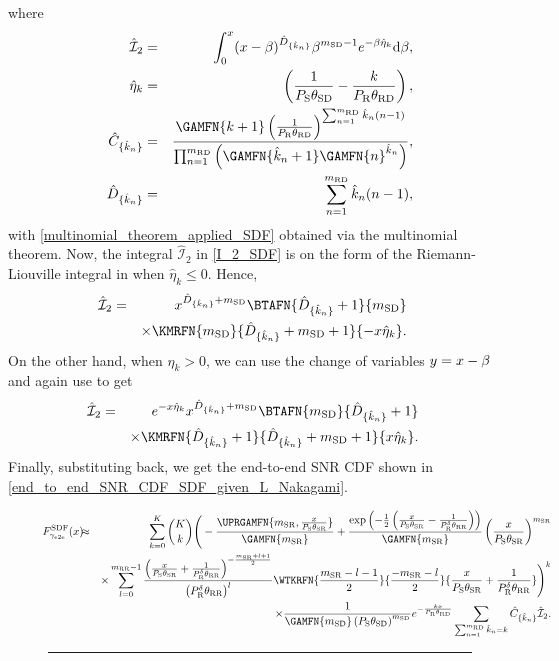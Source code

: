 \documentclass[10pt,journal]{IEEEtran}
\begin{document}
where
\begin{eqnarray}
\mathcal{\hat{I}}_2&=&\int_0^\RVval (\RVval-\beta)^{\hat{D}_{\{\hat{k}_n\}}}\beta^{\msd-1}e^{-\beta\hat{\eta}_k} \mathrm{d}\beta,\label{I_2_SDF}\\
\hat{\eta}_k&=&\left(\frac{1}{\PS\thetasd}-\frac{k}{\PR\thetard}\right),\\
\hat{C}_{\{\hat{k}_n\}}&=&\frac{\GAMFN{k+1}\left(\frac{1}{\PR\thetard}\right)^{\sum_{n=1}^{\mrd}\hat{k}_n(n-1)}}{\prod_{n=1}^{\mrd}\left(\GAMFN{\hat{k}_n+1}\GAMFN{n}^{\hat{k}_n}\right)},\\
\hat{D}_{\{\hat{k}_n\}}&=&\sum_{n=1}^{\mrd}\hat{k}_n(n-1),
\end{eqnarray}
with \eqref{multinomial_theorem_applied_SDF} obtained via the multinomial theorem. Now, the integral $\mathcal{\hat{I}}_2$ in \eqref{I_2_SDF} is on the form of the Riemann-Liouville integral in \cite[Eq. 3.383-1]{gradshteyn_ryzhik} when $\hat{\eta}_k \leq 0$. Hence,
\begin{eqnarray}
\!\!\!\!\!\!\!\!\mathcal{\hat{I}}_2
&=& \RVval^{\hat{D}_{\{\hat{k}_n\}}+\msd} \BTAFN{\hat{D}_{\{\hat{k}_n\}}+1}{\msd}
\nonumber\\&&\times
\KMRFN{\msd}{\hat{D}_{\{\hat{k}_n\}}+\msd+1}{-\RVval \hat{\eta}_k}.
\end{eqnarray}
On the other hand, when $\hat{\eta}_k > 0$, we can use the change of variables $y=x-\beta$ and again use \cite[Eq. 3.383-1]{gradshteyn_ryzhik} to get
\begin{eqnarray}
\!\!\!\!\!\!\!\!\mathcal{\hat{I}}_2
&=& e^{-\RVval \hat{\eta}_k} \RVval^{\hat{D}_{\{\hat{k}_n\}}+\msd} \BTAFN{\msd}{\hat{D}_{\{\hat{k}_n\}}+1}\nonumber\\&&\times
\KMRFN{\hat{D}_{\{\hat{k}_n\}}+1}{\hat{D}_{\{\hat{k}_n\}}+\msd+1}{\RVval \hat{\eta}_k}.
\end{eqnarray}
Finally, substituting back, we get the end-to-end \ac{SNR} \ac{CDF} shown in \eqref{end_to_end_SNR_CDF_SDF_given_L_Nakagami}.
\begin{figure*}
\centering
\begin{eqnarray}
\!\!\!F_{\etoeFDSNR}^{\rm SDF}(\RVval)
\!\!\!&\approx&\!\!\!\sum_{k=0}^K {K \choose k} \Bigg(
-\frac{\UPRGAMFN{\msr,\frac{\RVval}{\PS\thetasr}}}{\GAMFN{\msr}}+
\frac{\exp\left({-\frac{1}{2}\left(\frac{\RVval}{\PS\thetasr}-\frac{1}{\PR^\PWRSCL\thetarr}\right)}\right)}{\GAMFN{\msr}}\left(\frac{\RVval}{\PS\thetasr}\right)^{\msr}
\nonumber\\
&& \times \sum_{l=0}^{\mrr-1}\frac{\left(\frac{\RVval}{\PS\thetasr}+\frac{1}{\PR^\PWRSCL\thetarr}\right)^{-\frac{\msr+l+1}{2}}}{\left(\PR^\PWRSCL\thetarr\right)^{l}} \WTKRFN{\frac{\msr-l-1}{2}}{\frac{-\msr-l}{2}}{\frac{\RVval}{\PS\thetasr}+\frac{1}{\PR^\PWRSCL\thetarr}}\Bigg)^k
\nonumber\\
&& \times \frac{1}{\GAMFN{\msd}\left(\PS\thetasd\right)^\msd} e^{-\frac{k\RVval}{\PR\thetard}} \sum_{\sum_{n=1}^{\mrd} \hat{k}_{n} = k} \hat{C}_{\{\hat{k}_n\}} \mathcal{\hat{I}}_2.\label{end_to_end_SNR_CDF_SDF_given_L_Nakagami}
\end{eqnarray}
\hrule
\end{figure*}
\end{document}
